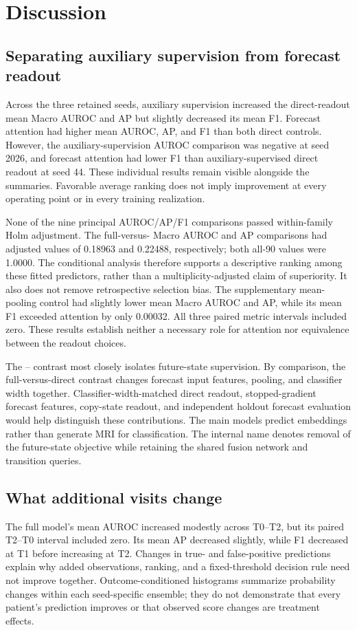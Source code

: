 \section{Discussion}
\label{sec:discussion}
\subsection{Separating auxiliary supervision from forecast readout}
Across the three retained seeds, auxiliary supervision increased the direct-readout mean Macro AUROC and AP but slightly decreased its mean F1. Forecast attention had higher mean AUROC, AP, and F1 than both direct controls. However, the auxiliary-supervision AUROC comparison was negative at seed 2026, and forecast attention had lower F1 than auxiliary-supervised direct readout at seed 44. These individual results remain visible alongside the summaries. Favorable average ranking does not imply improvement at every operating point or in every training realization.

None of the nine principal AUROC/AP/F1 comparisons passed within-family Holm adjustment. The full-versus-\nojepa{} Macro AUROC and AP comparisons had adjusted values of 0.18963 and 0.22488, respectively; both all-90 values were 1.0000. The conditional analysis therefore supports a descriptive ranking among these fitted predictors, rather than a multiplicity-adjusted claim of superiority. It also does not remove retrospective selection bias. The supplementary mean-pooling control had slightly lower mean Macro AUROC and AP, while its mean F1 exceeded attention by only 0.00032. All three paired metric intervals included zero. These results establish neither a necessary role for attention nor equivalence between the readout choices.

The \direct{}--\nojepa{} contrast most closely isolates future-state supervision. By comparison, the full-versus-direct contrast changes forecast input features, pooling, and classifier width together. Classifier-width-matched direct readout, stopped-gradient forecast features, copy-state readout, and independent holdout forecast evaluation would help distinguish these contributions. The main models predict embeddings rather than generate MRI for classification. The internal name \nojepa{} denotes removal of the future-state objective while retaining the shared fusion network and transition queries.

\subsection{What additional visits change}
The full model's mean AUROC increased modestly across T0--T2, but its paired T2--T0 interval included zero. Its mean AP decreased slightly, while F1 decreased at T1 before increasing at T2. Changes in true- and false-positive predictions explain why added observations, ranking, and a fixed-threshold decision rule need not improve together. Outcome-conditioned histograms summarize probability changes within each seed-specific ensemble; they do not demonstrate that every patient's prediction improves or that observed score changes are treatment effects.

